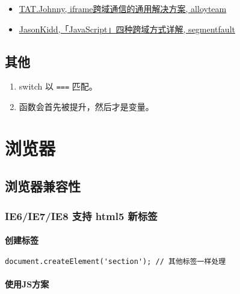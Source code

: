 \begin{itemize}
\tightlist
\item
  \href{http://www.alloyteam.com/2013/11/the-second-version-universal-solution-iframe-cross-domain-communication/}{TAT.Johnny,
  iframe跨域通信的通用解决方案, alloyteam}
\item
  \href{http://segmentfault.com/a/1190000003642057}{JasonKidd,「JavaScript」四种跨域方式详解,
  segmentfault}
\end{itemize}

\subsection{其他}\label{ux5176ux4ed6}

\begin{enumerate}
\def\labelenumi{\arabic{enumi}.}
\tightlist
\item
  switch 以 \lstinline!===! 匹配。
\item
  函数会首先被提升，然后才是变量。
\end{enumerate}

\section{浏览器}\label{ux6d4fux89c8ux5668}

\subsection{浏览器兼容性}\label{ux6d4fux89c8ux5668ux517cux5bb9ux6027}

\subsubsection{IE6/IE7/IE8 支持 html5
新标签}\label{ie6ie7ie8-ux652fux6301-html5-ux65b0ux6807ux7b7e}

\paragraph{创建标签}\label{ux521bux5efaux6807ux7b7e}

\begin{lstlisting}[language=HTML]
document.createElement('section'); // 其他标签一样处理
\end{lstlisting}

\paragraph{使用JS方案}\label{ux4f7fux7528jsux65b9ux6848}

